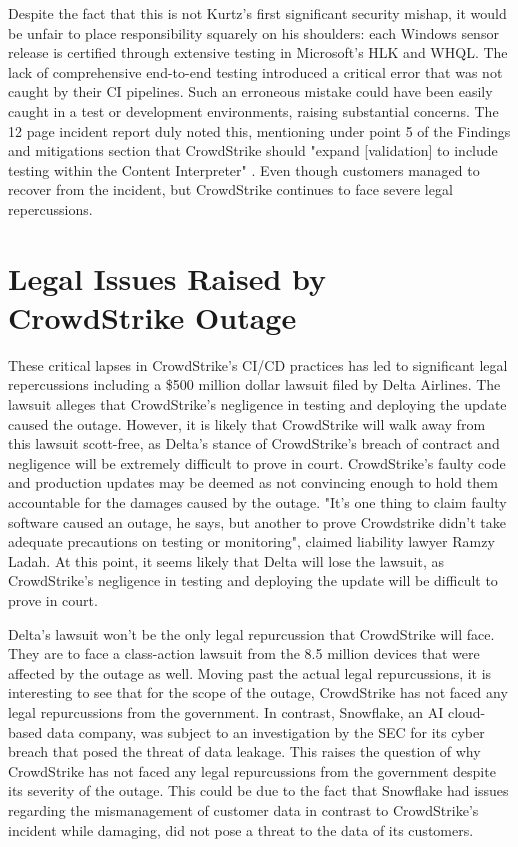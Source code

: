 Despite the fact that this is not Kurtz's first significant security mishap, it would be unfair to place responsibility squarely on his shoulders:
each Windows sensor release is certified through extensive testing in Microsoft's HLK and WHQL.
The lack of comprehensive end-to-end testing introduced a critical error that was not caught by their CI pipelines. Such an erroneous
mistake could have been easily caught in a test or development environments, raising substantial concerns.
The 12 page incident report duly noted this, mentioning under point 5 of the Findings and mitigations section that CrowdStrike should
"expand [validation] to include testing within the Content Interpreter" \cite{crowdstrikechannelfile291rca}.
Even though customers managed to recover from the incident, but CrowdStrike continues to face severe legal repercussions.

\section{Legal Issues Raised by CrowdStrike Outage}
These critical lapses in CrowdStrike's CI/CD practices has led to significant legal repercussions including a \$500 million dollar lawsuit
filed by Delta Airlines. 
The lawsuit alleges that CrowdStrike's negligence in testing and deploying the update caused the outage.
However, it is likely that CrowdStrike will walk away from this lawsuit scott-free, as Delta's stance of CrowdStrike's breach of contract and negligence will be
extremely difficult to prove in court. CrowdStrike's faulty code and production updates may be deemed as not convincing enough to hold them accountable for the damages caused by the outage.
"It's one thing to claim faulty software caused an outage, he says, but another to prove Crowdstrike didn’t take adequate precautions on testing or monitoring", claimed liability lawyer Ramzy Ladah.
\cite{delta_lose} At this point, it seems likely that Delta will lose the lawsuit, as CrowdStrike's negligence in testing and deploying the update will be difficult to prove in court.


Delta's lawsuit won't be the only legal repurcussion that CrowdStrike will face. They are to face a class-action lawsuit from the 8.5 million devices that were affected by the outage as well. Moving past
the actual legal repurcussions, it is interesting to see that for the scope of the outage, CrowdStrike has not faced any legal repurcussions from the government. In contrast, Snowflake, an AI cloud-based data company,
was subject to an investigation by the SEC for its cyber breach that posed the threat of data leakage. \cite{snowflake_sec} This raises the question of why CrowdStrike has not faced any legal repurcussions from the government despite
its severity of the outage. This could be due to the fact that Snowflake had issues regarding the mismanagement of customer data in contrast to CrowdStrike's incident while damaging,
did not pose a threat to the data of its customers.


